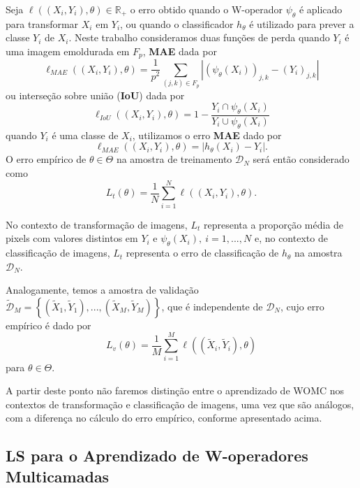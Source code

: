 Seja $ \ell \left( \left( X_{i}, Y_{i} \right), \theta \right) \in \mathbb{R}_{+}$ o erro obtido quando o W-operador $ \psi_{\theta}$  é aplicado para transformar $X_{i}$ em $Y_{i}$, ou quando o classificador $h_{\theta}$ é utilizado para prever a classe $Y_{i}$ de $X_{i}$. Neste trabalho consideramos duas funções de perda quando $Y_{i}$ é uma imagem emoldurada em $F_{p}$, \textbf{MAE} dada por
$$ \ell_{MAE} \left( \left( X_{i}, Y_{i} \right), \theta \right) = \frac{1}{p^{2}} \sum_{(j,k) \in F_{p}} | \left( \psi_{\theta} \left( X_{i} \right) \right)_{j,k} - \left( Y_{i} \right)_{j,k} | $$
ou interseção sobre união (\textbf{IoU}) dada por
$$ \ell_{IoU} \left( \left( X_{i}, Y_{i} \right), \theta \right) = 1 - \frac{Y_{i} \cap \psi_{\theta} \left( X_{i} \right)}{Y_{i} \cup \psi_{\theta} \left( X_{i} \right)} $$
quando $Y_{i}$ é uma classe de $X_{i}$, utilizamos o erro \textbf{MAE} dado por
$$ \ell_{MAE} \left( \left( X_{i}, Y_{i} \right), \theta \right) = | h_{\theta} \left( X_{i} \right) - Y_{i} |. $$
O erro empírico de $\theta \in \Theta$ na amostra de treinamento $\mathcal{D}_{N}$ será então considerado como
$$ L_{t} \left( \theta \right) = \frac{1}{N} \sum_{i=1}^{N} \ell  \left( \left( X_{i}, Y_{i} \right), \theta \right). $$

No contexto de transformação de imagens, $L_{t}$ representa a proporção média de pixels com valores distintos em $Y_{i}$ e $\psi_{\theta} \left( X_{i} \right), \ i=1,...,N $ e, no contexto de classificação de imagens, $L_{t}$ representa o erro de classificação de $h_{\theta}$ na amostra $\mathcal{D}_{N}$.

Analogamente, temos a amostra de validação $\tilde{\mathcal{D}}_{M} = \left\{ \left( \tilde{X}_{1}, \tilde{Y}_{1} \right),...,\left( \tilde{X}_{M}, \tilde{Y}_{M} \right) \right\} $, que é independente de $\mathcal{D}_{N}$, cujo erro empírico é dado por
$$ L_{v} \left( \theta \right) = \frac{1}{M} \sum_{i=1}^{M} \ell  \left( \left( \tilde{X}_{i}, \tilde{Y}_{i} \right), \theta \right) $$
para $\theta \in \Theta$.

A partir deste ponto não faremos distinção entre o aprendizado de WOMC nos contextos de transformação e classificação de imagens, uma vez que são análogos, com a diferença no cálculo do erro empírico, conforme apresentado acima.

\subsection{LS para o Aprendizado de W-operadores Multicamadas}

